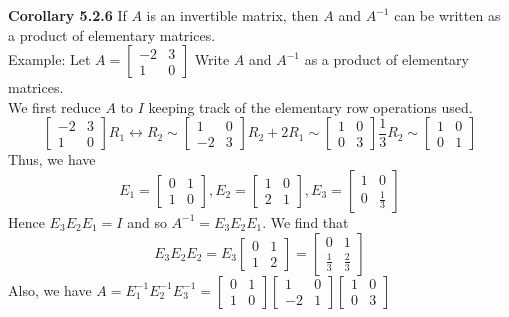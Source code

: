 \documentclass[10pt,letter]{article}
\begin{document}
\textbf{Corollary 5.2.6} If $A$ is an invertible matrix, then $A$ and $A^{-1}$ can be written as a product of elementary matrices. \\ 
Example: Let $A=\begin{bmatrix}-2&3\\1&0\end{bmatrix}$ Write $A$ and $A^{-1}$ as a product of elementary matrices. \\ 
We first reduce $A$ to $I$ keeping track of the elementary row operations used. $$\begin{bmatrix}-2&3\\1&0\end{bmatrix}R_1\leftrightarrow R_2\sim \begin{bmatrix}1&0\\-2&3\end{bmatrix} R_2+2R_1\sim \begin{bmatrix}1&0\\0&3\end{bmatrix} \frac{1}{3}R_2\sim\begin{bmatrix}1&0\\0&1\end{bmatrix}$$ Thus, we have $$E_1 = \begin{bmatrix}0&1\\1&0\end{bmatrix}, E_2 = \begin{bmatrix}1&0\\2&1\end{bmatrix}, E_3=\begin{bmatrix}1&0\\0&\frac{1}{3}\end{bmatrix}$$ Hence $E_3E_2E_1=I$ and so $A^{-1}=E_3E_2E_1$. We find that $$E_3E_2E_2=E_3\begin{bmatrix}0&1\\1&2\end{bmatrix}=\begin{bmatrix}0&1\\\frac{1}{3}&\frac{2}{3}\end{bmatrix}$$ Also, we have $A=E_1^{-1}E_2^{-1}E_3^{-1}=\begin{bmatrix}0&1\\1&0\end{bmatrix}\begin{bmatrix}1&0\\-2&1\end{bmatrix}\begin{bmatrix}1&0\\0&3\end{bmatrix}$
\end{document}
